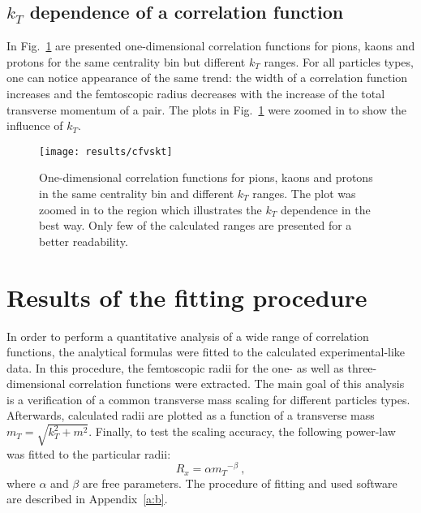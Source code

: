     \subsection{$k_T$ dependence of a correlation function}
      In Fig.~\ref{fig:kt_dep} are presented one-dimensional correlation functions for pions, kaons and protons for the same centrality bin but different $k_T$ ranges.
      For all particles types, one can notice appearance of the same trend: the width of a correlation function increases and the femtoscopic radius decreases with the increase of the total transverse momentum of a pair.
      The plots in Fig.~\ref{fig:kt_dep} were zoomed in to show the influence of $k_T$.

      \begin{figure}[h]
        \centering
        \centerline{\texttt{[image: results/cfvskt]}}
        \caption{One-dimensional correlation functions for pions, kaons and protons in the same centrality bin and different $k_T$ ranges. The plot was zoomed in to the region which illustrates the $k_T$ dependence in the best way. Only few of the calculated ranges are presented for a better readability.}
      \label{fig:kt_dep}
      \end{figure}
    \FloatBarrier
    \clearpage
  \section{Results of the fitting procedure}
    In order to perform a quantitative analysis of a wide range of correlation functions, the analytical formulas were fitted to the calculated experimental-like data.
    In this procedure, the femtoscopic radii for the one- as well as three-dimensional correlation functions were extracted.
    The main goal of this analysis is a verification of a common transverse mass scaling for different particles types.
    Afterwards, calculated radii are plotted as a function of a transverse mass $m_T = \sqrt{k_T^2 +m^2}$.
    Finally, to test the scaling accuracy, the following power-law was fitted to the particular radii:
    \begin{equation}
      \label{eq:power-law}
      R_x = \alpha {m_T}^{-\beta}~,
    \end{equation}
    where $\alpha$ and $\beta$ are free parameters.
    The procedure of fitting and used software are described in Appendix~\ref{a:b}.
